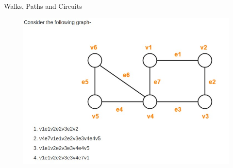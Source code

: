 \documentclass{beamer}
\begin{document}
\begin{frame}{Walks, Paths and Circuits}
	\begin{figure}
		\includegraphics[scale=.6]{img/m46}
	\end{figure}
\end{frame}
\end{document}
